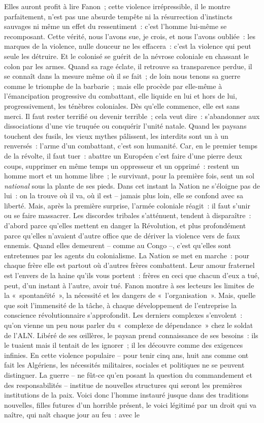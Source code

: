 \documentclass[french,twoside]{book} %
\begin{document}
Elles auront profit à lire Fanon ; cette violence irrépressible, il le montre parfaitement, n’est pas une absurde tempête ni la   résurrection d’instincts sauvages ni même un effet du ressentiment : c’est l’homme lui-même se recomposant. Cette vérité, nous l’avons sue, je crois, et nous l’avons oubliée : les marques de la violence, nulle douceur ne les effacera : c’est la violence qui peut seule les détruire. Et le colonisé se guérit de la névrose coloniale en chassant le colon par les armes. Quand sa rage éclate, il retrouve sa transparence perdue, il se connaît dans la mesure même où il se fait ; de loin nous tenons sa guerre comme le triomphe de la barbarie ; mais elle procède par elle-même à l’émancipation progressive du combattant, elle liquide en lui et hors de lui, progressivement, les ténèbres coloniales. Dès qu’elle commence, elle est sans merci. Il faut rester terrifié ou devenir terrible ; cela veut dire : s’abandonner aux dissociations d’une vie truquée ou conquérir l’unité natale. Quand les paysans touchent des fusils, les vieux mythes pâlissent, les interdits sont un à un renversés : l’arme d’un combattant, c’est son humanité. Car, en le premier temps de la révolte, il faut tuer : abattre un Européen c’est faire d’une pierre deux coups, supprimer en même temps un oppresseur et un opprimé : restent un homme mort et un homme libre ; le survivant, pour la première fois, sent un sol \emph{national} sous la plante de ses pieds. Dans cet instant la Nation ne s’éloigne pas de lui : on la trouve où il va, où il est – jamais plus loin, elle se confond avec sa liberté. Mais, après la première surprise, l’armée coloniale réagit : il faut s’unir ou se faire massacrer. Les discordes tribales s’atténuent, tendent à disparaître : d’abord parce qu’elles mettent en danger la Révolution, et plus profondément parce qu’elles n’avaient d’autre office que de dériver la violence vers de faux ennemis. Quand elles demeurent – comme au Congo –, c’est qu’elles sont entretenues par les agents du colonialisme. La Nation se met en marche : pour chaque frère elle est partout où d’autres frères combattent. Leur amour fraternel est l’envers de la haine qu’ils vous portent : frères en ceci que chacun d’eux a tué, peut, d’un instant à l’autre, avoir tué. Fanon montre à ses lecteurs les limites de la « spontanéité », la nécessité et les dangers de « l’organisation ». Mais, quelle que soit l’immensité de la tâche, à   chaque développement de l’entreprise la conscience révolutionnaire s’approfondit. Les derniers complexes s’envolent : qu’on vienne un peu nous parler du « complexe de dépendance » chez le soldat de l’ALN. Libéré de ses œillères, le paysan prend connaissance de ses besoins : ils le tuaient mais il tentait de les ignorer ; il les découvre comme des exigences infinies. En cette violence populaire – pour tenir cinq ans, huit ans comme ont fait les Algériens, les nécessités militaires, sociales et politiques ne se peuvent distinguer. La guerre – ne fût-ce qu’en posant la question du commandement et des responsabilités – institue de nouvelles structures qui seront les premières institutions de la paix. Voici donc l’homme instauré jusque dans des traditions nouvelles, filles futures d’un horrible présent, le voici légitimé par un droit qui va naître, qui naît chaque jour au feu : avec le 
\end{document}
